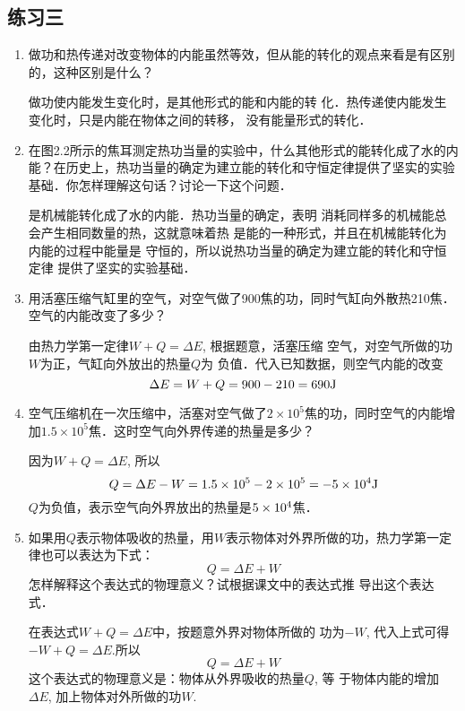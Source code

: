 \subsection{练习三}
\begin{enumerate}
		\item 做功和热传递对改变物体的内能虽然等效，但从能的转化的观点来看是有区别的，这种区别是什么？
		
\begin{solution}
    做功使内能发生变化时，是其他形式的能和内能的转
化．热传递使内能发生变化时，只是内能在物体之间的转移，
没有能量形式的转化．
\end{solution}
	\item 在图2.2所示的焦耳测定热功当量的实验中，什么其他形式的能转化成了水的内能？在历史上，热功当量的确定为建立能的转化和守恒定律提供了坚实的实验基础．你怎样理解这句话？讨论一下这个问题．
		
    \begin{solution}
    是机械能转化成了水的内能．热功当量的确定，表明
    消耗同样多的机械能总会产生相同数量的热，这就意味着热
    是能的一种形式，并且在机械能转化为内能的过程中能量是
    守恒的，所以说热功当量的确定为建立能的转化和守恒定律
    提供了坚实的实验基础．
    \end{solution}
	\item 用活塞压缩气缸里的空气，对空气做了900焦的功，同时气缸向外散热210焦．空气的内能改变了多少？
	
\begin{solution}
由热力学第一定律$W+Q=\Delta E$, 根据题意，活塞压缩
空气，对空气所做的功$W$为正，气缸向外放出的热量$Q$为
负值．代入已知数据，则空气内能的改变
\[\Delta E=W+Q=900-210=690{\rm J}\]
\end{solution}
	\item 空气压缩机在一次压缩中，活塞对空气做了$2\times 10^5$焦的功，同时空气的内能增加$1.5\times 10^5$焦．这时空气向外界传递的热量是多少？
		
    \begin{solution}
因为$W+Q=\Delta E$, 所以
\[Q=\Delta E-W=1.5\times10^5-2\times10^5 =-5\times10^4{\rm J}\]
$Q$为负值，表示空气向外界放出的热量是$5\times10^4$焦．
    \end{solution}
	\item 如果用$Q$表示物体吸收的热量，用$W$表示物体对外界所做的功，热力学第一定律也可以表达为下式：
	\[Q=\Delta E+W\]
	怎样解释这个表达式的物理意义？试根据课文中的表达式推
导出这个表达式．
		
\begin{solution}
    在表达式$W+Q=\Delta E$中，按题意外界对物体所做的
功为$-W$, 代入上式可得$-W+Q=\Delta E$.所以
\[Q=\Delta E+W\]
这个表达式的物理意义是：物体从外界吸收的热量$Q$, 等
于物体内能的增加$\Delta E$, 加上物体对外所做的功$W$.
\end{solution}
\end{enumerate}

